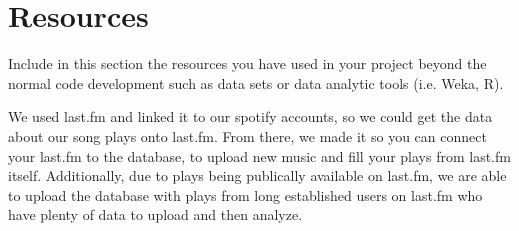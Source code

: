 \documentclass[12pt]{article}
\begin{document}
    \section{Resources}
    Include in this section the resources you have used in your project beyond the normal code development such as data sets or data analytic tools (i.e. Weka, R).

    We used last.fm and linked it to our spotify accounts, so we could
    get the data about our song plays onto last.fm. From there, we made
    it so you can connect your last.fm to the database, to upload new music
    and fill your plays from last.fm itself. Additionally, due to plays
    being publically available on last.fm, we are able to upload the
    database with plays from long established users on last.fm who
    have plenty of data to upload and then analyze.
\end{document}
